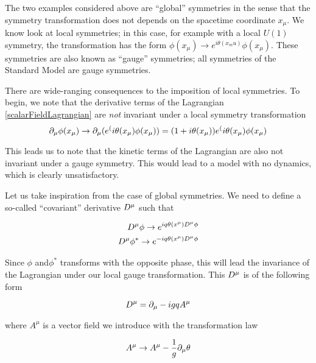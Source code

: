 The two examples considered above are ``global'' symmetries in the sense that the symmetry transformation does not depends on the spacetime coordinate $x_\mu$.
We know look at local symmetries; in this case, for example with a local $U(1)$ symmetry,  the transformation has the form $\phi(x_\mu) \rightarrow e^{i \theta (x_mu)} \phi(x_\mu)$.
These symmetries are also known as ``gauge'' symmetries; all symmetries of the Standard Model are gauge symmetries.

There are wide-ranging consequences to the imposition of local symmetries.
To begin, we note that the derivative terms of the Lagrangian \ref{scalarFieldLagrangian} are \textit{not} invariant under a local symmetry transformation
\begin{equation}
\partial_\mu \phi(x_\mu) \rightarrow \partial_\mu ( e^(i\theta(x_\mu) \phi(x_\mu )) = (1 + i \theta(x_\mu) ) e^(i\theta(x_\mu) \phi(x_\mu )
\end{equation}

This leads us to note that the kinetic terms of the Lagrangian are also not invariant under a gauge symmetry.
This would lead to a model with no dynamics, which is clearly unsatisfactory.

Let us take inspiration from the case of global symmetries.
We need to define a so-called ``covariant'' derivative $D^\mu$ such that

\begin{equation}
\begin{aligned}
D^\mu \phi   \rightarrow e^{ i q \theta(x^\mu) D^\mu \phi} \\
D^\mu \phi^* \rightarrow e^{-i q \theta(x^\mu) D^\mu \phi} \\
\end{aligned}
\end{equation}

Since $\phi$ and$\phi^*$ transforms with the opposite phase, this will lead the invariance of the Lagrangian under our local gauge transformation.
This $D^\mu$ is of the following form

\begin{equation}
D^\mu = \partial_\mu - i g q A^\mu
\end{equation}

where $A^\mu$ is a vector field we introduce with the transformation law

\begin{equation}
A^\mu \rightarrow A^\mu - \frac{1}{g} \partial_\mu \theta
\end{equation}

